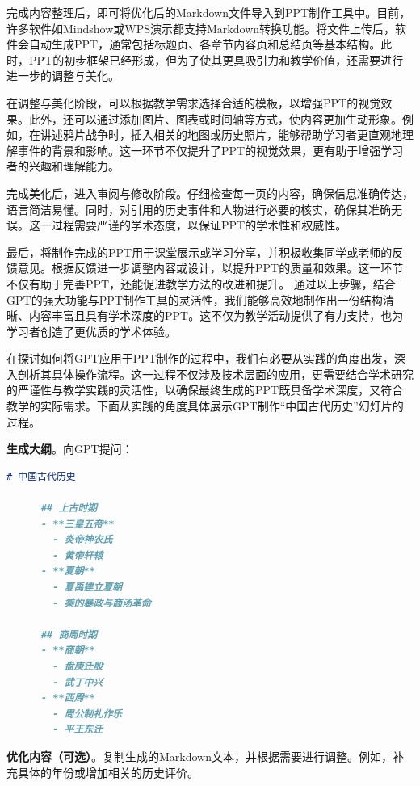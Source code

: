 完成内容整理后，即可将优化后的Markdown文件导入到PPT制作工具中。目前，许多软件如Mindshow或WPS演示都支持Markdown转换功能。将文件上传后，软件会自动生成PPT，通常包括标题页、各章节内容页和总结页等基本结构。此时，PPT的初步框架已经形成，但为了使其更具吸引力和教学价值，还需要进行进一步的调整与美化。

在调整与美化阶段，可以根据教学需求选择合适的模板，以增强PPT的视觉效果。此外，还可以通过添加图片、图表或时间轴等方式，使内容更加生动形象。例如，在讲述鸦片战争时，插入相关的地图或历史照片，能够帮助学习者更直观地理解事件的背景和影响。这一环节不仅提升了PPT的视觉效果，更有助于增强学习者的兴趣和理解能力。

完成美化后，进入审阅与修改阶段。仔细检查每一页的内容，确保信息准确传达，语言简洁易懂。同时，对引用的历史事件和人物进行必要的核实，确保其准确无误。这一过程需要严谨的学术态度，以保证PPT的学术性和权威性。

最后，将制作完成的PPT用于课堂展示或学习分享，并积极收集同学或老师的反馈意见。根据反馈进一步调整内容或设计，以提升PPT的质量和效果。这一环节不仅有助于完善PPT，还能促进教学方法的改进和提升。
通过以上步骤，结合GPT的强大功能与PPT制作工具的灵活性，我们能够高效地制作出一份结构清晰、内容丰富且具有学术深度的PPT。这不仅为教学活动提供了有力支持，也为学习者创造了更优质的学术体验。

在探讨如何将GPT应用于PPT制作的过程中，我们有必要从实践的角度出发，深入剖析其具体操作流程。这一过程不仅涉及技术层面的应用，更需要结合学术研究的严谨性与教学实践的灵活性，以确保最终生成的PPT既具备学术深度，又符合教学的实际需求。下面从实践的角度具体展示GPT制作``中国古代历史''幻灯片的过程。

\textbf{生成大纲}。向GPT提问：


\begin{gptbox}
\small{
\begin{lstlisting}[language=Markdown]
      # 中国古代历史
      
      ## 上古时期
      - **三皇五帝**
        - 炎帝神农氏
        - 黄帝轩辕
      - **夏朝**
        - 夏禹建立夏朝
        - 桀的暴政与商汤革命
      
      ## 商周时期
      - **商朝**
        - 盘庚迁殷
        - 武丁中兴
      - **西周**
        - 周公制礼作乐
        - 平王东迁
\end{lstlisting}
}
\end{gptbox}


\textbf{优化内容（可选）}。复制生成的Markdown文本，并根据需要进行调整。例如，补充具体的年份或增加相关的历史评价。


